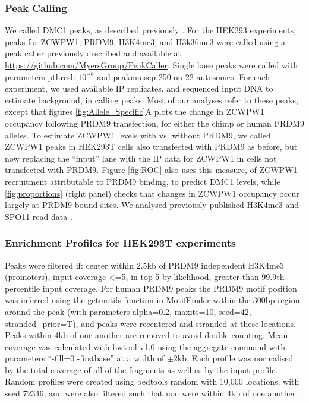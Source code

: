 \subsubsection{Peak Calling}
We called DMC1 peaks, as described previously \parencite{Davies2016Reengineering}.
For the HEK293 experiments, peaks for ZCWPW1, PRDM9, H3K4me3, and H3k36me3 were called using a peak caller previously described \parencite{Davies2016Reengineering} and available at \url{https://github.com/MyersGroup/PeakCaller}.
Single base peaks were called with parameters pthresh $10^{-6}$ and peakminsep 250 on 22 autosomes.
For each experiment, we used available IP replicates, and sequenced input DNA to estimate background, in calling peaks.
Most of our analyses refer to these peaks, except that figures \ref{fig:Allele_Specific}A plots the change in ZCWPW1 occupancy following PRDM9 transfection, for either the chimp or human PRDM9 alleles.
To estimate ZCWPW1 levels with vs. without PRDM9, we called ZCWPW1 peaks in HEK293T cells also transfected with PRDM9 as before, but now replacing the ``input'' lane with the IP data for ZCWPW1 in cells not transfected with PRDM9.
Figure \ref{fig:ROC} also uses this measure, of ZCWPW1 recruitment attributable to PRDM9 binding, to predict DMC1 levels, while \ref{fig:proportions} (right panel) checks that changes in ZCWPW1 occupancy occur largely at PRDM9-bound sites.
We analysed previously published H3K4me3 and SPO11 read data \parencite{Davies2016Reengineering, Lange2016Landscape}.

\subsubsection{Enrichment Profiles for HEK293T experiments}
Peaks were filtered if: center within 2.5kb of PRDM9 independent H3K4me3 (promoters), input coverage <=5, in top 5 by likelihood, greater than 99.9th percentile input coverage.
For human PRDM9 peaks the PRDM9 motif position \parencite{Altemose2017map} was inferred using the getmotifs function in MotifFinder within the 300bp region around the peak (with parameters alpha=0.2, maxits=10, seed=42, stranded\_prior=T), and peaks were recentered and stranded at these locations.
Peaks within 4kb of one another are removed to avoid double counting.
Mean coverage was calculated with bwtool v1.0 using the aggregate command with parameters “-fill=0 -firstbase” at a width of $\pm2$kb.
Each profile was normalised by the total coverage of all of the fragments as well as by the input profile.
Random profiles were created using bedtools random with 10,000 locations, with seed 72346, and were also filtered such that non were within 4kb of one another.

